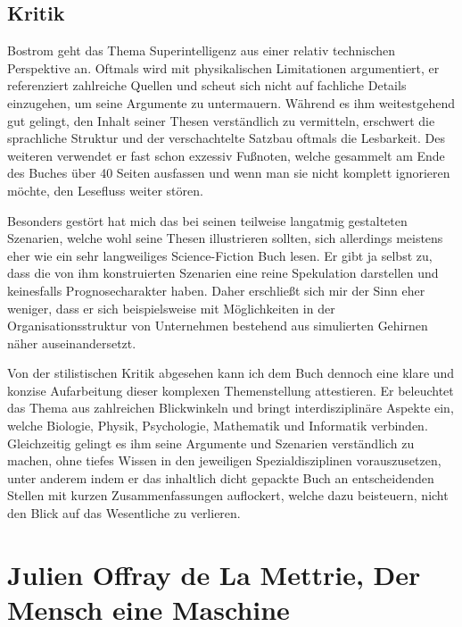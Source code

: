 \documentclass[twoside, a4paper, DIV=11, open=any, bibliography=totoc]{scrbook}
\begin{document}
\subsection{Kritik} \label{sec:litkritik}

Bostrom geht das Thema Superintelligenz aus einer relativ technischen Perspektive
an. Oftmals wird mit physikalischen Limitationen argumentiert, er referenziert
zahlreiche Quellen und scheut sich nicht auf fachliche Details einzugehen, um seine
Argumente zu untermauern. Während es ihm weitestgehend gut gelingt, den Inhalt seiner
Thesen verständlich zu vermitteln, erschwert die sprachliche Struktur und der
verschachtelte Satzbau oftmals die Lesbarkeit. Des weiteren verwendet er fast schon
exzessiv Fußnoten, welche gesammelt am Ende des Buches über 40 Seiten ausfassen und
wenn man sie nicht komplett ignorieren möchte, den Lesefluss weiter stören.

Besonders gestört hat mich das bei seinen teilweise
langatmig gestalteten Szenarien, welche wohl seine Thesen illustrieren sollten,
sich allerdings meistens eher wie ein sehr langweiliges Science-Fiction Buch lesen.
Er gibt ja selbst zu, dass die von ihm konstruierten Szenarien eine reine Spekulation
darstellen und keinesfalls Prognosecharakter haben. Daher erschließt sich mir
der Sinn eher weniger, dass er sich beispielsweise mit Möglichkeiten in der
Organisationsstruktur von Unternehmen bestehend aus simulierten Gehirnen näher auseinandersetzt.

Von der stilistischen Kritik abgesehen kann ich dem Buch dennoch eine klare
und konzise Aufarbeitung dieser komplexen Themenstellung attestieren. Er beleuchtet
das Thema aus zahlreichen Blickwinkeln und bringt interdisziplinäre Aspekte ein,
welche Biologie, Physik, Psychologie, Mathematik und Informatik verbinden.
Gleichzeitig gelingt es ihm seine Argumente und Szenarien verständlich zu machen,
ohne tiefes Wissen in den jeweiligen Spezialdisziplinen vorauszusetzen, unter anderem indem
er das inhaltlich dicht gepackte Buch an entscheidenden Stellen mit kurzen
Zusammenfassungen auflockert, welche dazu beisteuern, nicht den Blick auf das
Wesentliche zu verlieren.


\section{Julien Offray de La Mettrie, Der Mensch eine Maschine} \label{sec:litb2}
\end{document}
